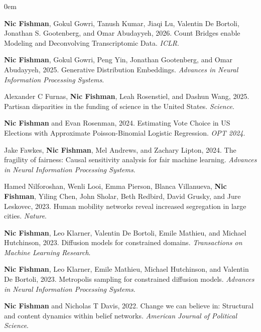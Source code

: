 \begin{cvparagraph}


\begin{addmargin}[2em]{0em}

\textbf{Nic Fishman}, Gokul Gowri, Tanush Kumar, Jiaqi Lu, Valentin De Bortoli, Jonathan S. Gootenberg, and Omar Abudayyeh, 2026. Count Bridges enable Modeling and Deconvolving Transcriptomic Data. \textit{ICLR}.

\textbf{Nic Fishman}, Gokul Gowri, Peng Yin, Jonathan Gootenberg, and Omar Abudayyeh, 2025. Generative Distribution Embeddings. \textit{Advances in Neural Information Processing Systems}.

Alexander C Furnas, \textbf{Nic Fishman}, Leah Rosenstiel, and Dashun Wang, 2025. Partisan disparities in the funding of science in the United States. \textit{Science}.

\textbf{Nic Fishman} and Evan Rosenman, 2024. Estimating Vote Choice in US Elections with Approximate Poisson-Binomial Logistic Regression. \textit{OPT 2024}.

Jake Fawkes, \textbf{Nic Fishman}, Mel Andrews, and Zachary Lipton, 2024. The fragility of fairness: Causal sensitivity analysis for fair machine learning. \textit{Advances in Neural Information Processing Systems}.

Hamed Nilforoshan, Wenli Looi, Emma Pierson, Blanca Villanueva, \textbf{Nic Fishman}, Yiling Chen, John Sholar, Beth Redbird, David Grusky, and Jure Leskovec, 2023. Human mobility networks reveal increased segregation in large cities. \textit{Nature}.

\textbf{Nic Fishman}, Leo Klarner, Valentin De Bortoli, Emile Mathieu, and Michael Hutchinson, 2023. Diffusion models for constrained domains. \textit{Transactions on Machine Learning Research}.

\textbf{Nic Fishman}, Leo Klarner, Emile Mathieu, Michael Hutchinson, and Valentin De Bortoli, 2023. Metropolis sampling for constrained diffusion models. \textit{Advances in Neural Information Processing Systems}.

\textbf{Nic Fishman} and Nicholas T Davis, 2022. Change we can believe in: Structural and content dynamics within belief networks. \textit{American Journal of Political Science}.


\end{addmargin}
\end{cvparagraph}
